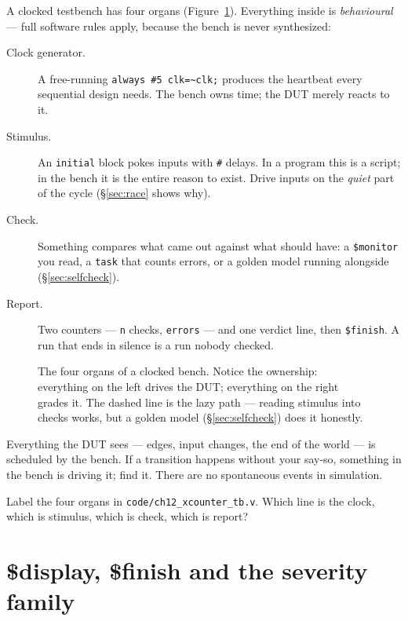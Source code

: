  A clocked
testbench has four organs (Figure~\ref{fig:tbanatomy}). Everything
inside is \emph{behavioural} --- full software rules apply, because
the bench is never synthesized:

\begin{description}
\item[Clock generator.] A free-running
\texttt{always \#5 clk=\textasciitilde clk;} produces the heartbeat
every sequential design needs. The bench owns time; the DUT merely
reacts to it.
\item[Stimulus.] An \texttt{initial} block pokes inputs with
\texttt{\#} delays. In a program this is a script; in the bench it is
the entire reason to exist. Drive inputs on the \emph{quiet} part of
the cycle (\S\ref{sec:race} shows why).
\item[Check.] Something compares what came out against what should
have: a \texttt{\$monitor} you read, a \texttt{task} that counts
errors, or a golden model running alongside
(\S\ref{sec:selfcheck}).
\item[Report.] Two counters --- \texttt{n} checks, \texttt{errors}
--- and one verdict line, then \texttt{\$finish}. A run that ends in
silence is a run nobody checked.
\end{description}

\begin{figure}[htbp]
\centering

\caption{The four organs of a clocked bench. Notice the ownership:
everything on the left drives the DUT; everything on the right grades
it. The dashed line is the lazy path --- reading stimulus into checks
works, but a golden model (\S\ref{sec:selfcheck}) does it honestly.}
\label{fig:tbanatomy}
\end{figure}

\begin{rulebox}
Everything the DUT sees --- edges, input changes, the end of the
world --- is scheduled by the bench. If a transition happens without
your say-so, something in the bench is driving it; find it. There are
no spontaneous events in simulation.
\end{rulebox}

\begin{exercise}[easy]
Label the four organs in \texttt{code/ch12\_xcounter\_tb.v}. Which
line is the clock, which is stimulus, which is check, which is
report?
\end{exercise}

\section{\$display, \$finish and the severity family}
\label{sec:severity}

